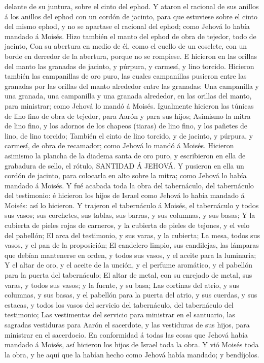 delante de su juntura, sobre el cinto del ephod.  Y ataron
el racional de sus anillos á los anillos del ephod con un cordón de
jacinto, para que estuviese sobre el cinto del mismo ephod, y no se
apartase el racional del ephod; como Jehová lo había mandado á Moisés.
 Hizo también el manto del ephod de obra de tejedor, todo
de jacinto,  Con su abertura en medio de él, como el cuello
de un coselete, con un borde en derredor de la abertura, porque no se
rompiese.  E hicieron en las orillas del manto las granadas
de jacinto, y púrpura, y carmesí, y lino torcido.  Hicieron
también las campanillas de oro puro, las cuales campanillas pusieron
entre las granadas por las orillas del manto alrededor entre las
granadas:  Una campanilla y una granada, una campanilla y
una granada alrededor, en las orillas del manto, para ministrar; como
Jehová lo mandó á Moisés.  Igualmente hicieron las túnicas
de lino fino de obra de tejedor, para Aarón y para sus hijos;
 Asimismo la mitra de lino fino, y los adornos de los
chapeos (tiaras) de lino fino, y los pañetes de lino, de lino torcido;
 También el cinto de lino torcido, y de jacinto, y púrpura,
y carmesí, de obra de recamador; como Jehová lo mandó á Moisés.
 Hicieron asimismo la plancha de la diadema santa de oro
puro, y escribieron en ella de grabadura de sello, el rótulo, SANTIDAD Á
JEHOVÁ.  Y pusieron en ella un cordón de jacinto, para
colocarla en alto sobre la mitra; como Jehová lo había mandado á Moisés.
 Y fué acabada toda la obra del tabernáculo, del
tabernáculo del testimonio: é hicieron los hijos de Israel como Jehová
lo había mandado á Moisés: así lo hicieron.  Y trajeron el
tabernáculo á Moisés, el tabernáculo y todos sus vasos; sus corchetes,
sus tablas, sus barras, y sus columnas, y sus basas;  Y la
cubierta de pieles rojas de carneros, y la cubierta de pieles de
tejones, y el velo del pabellón;  El arca del testimonio, y
sus varas, y la cubierta;  La mesa, todos sus vasos, y el
pan de la proposición;  El candelero limpio, sus
candilejas, las lámparas que debían mantenerse en orden, y todos sus
vasos, y el aceite para la luminaria;  Y el altar de oro, y
el aceite de la unción, y el perfume aromático, y el pabellón para la
puerta del tabernáculo;  El altar de metal, con su enrejado
de metal, sus varas, y todos sus vasos; y la fuente, y su basa;
 Las cortinas del atrio, y sus columnas, y sus basas, y el
pabellón para la puerta del atrio, y sus cuerdas, y sus estacas, y todos
los vasos del servicio del tabernáculo, del tabernáculo del testimonio;
 Las vestimentas del servicio para ministrar en el
santuario, las sagradas vestiduras para Aarón el sacerdote, y las
vestiduras de sus hijos, para ministrar en el sacerdocio. 
En conformidad á todas las cosas que Jehová había mandado á Moisés, así
hicieron los hijos de Israel toda la obra.  Y vió Moisés
toda la obra, y he aquí que la habían hecho como Jehová había mandado; y
bendíjolos.


